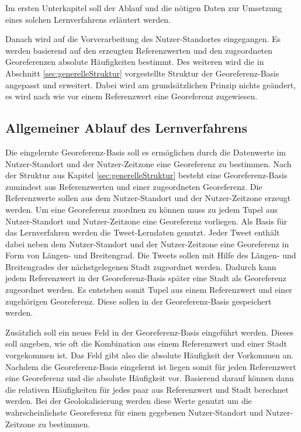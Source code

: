 		Im ersten Unterkapitel soll der Ablauf und die nötigen Daten zur Umsetzung eines solchen Lernverfahrens erläutert werden.

		Danach wird auf die Vorverarbeitung des Nutzer-Standortes eingegangen.
		Es werden basierend auf den erzeugten Referenzwerten und den zugeordneten Georeferenzen absolute Häufigkeiten bestimmt.
		Des weiteren wird die in Abschnitt \ref{sec:generelleStruktur} vorgestellte Struktur der Georeferenz-Basis angepasst und erweitert.
		Dabei wird am grundsätzlichen Prinzip nichts geändert, es wird nach wie vor einem Referenzwert eine Georeferenz zugewiesen. 

		\subsection{Allgemeiner Ablauf des Lernverfahrens}

			Die eingelernte Georeferenz-Basis soll es ermöglichen durch die Datenwerte im Nutzer-Standort und der Nutzer-Zeitzone eine Georeferenz zu bestimmen.
			Nach der Struktur aus Kapitel \ref{sec:generelleStruktur} besteht eine Georeferenz-Basis zumindest aus Referenzwerten und einer zugeordneten Georeferenz.
			Die Referenzwerte sollen aus dem Nutzer-Standort und der Nutzer-Zeitzone erzeugt werden.
			Um eine Georeferenz zuordnen zu können muss zu jedem Tupel aus Nutzer-Standort und Nutzer-Zeitzone eine Georeferenz vorliegen.
			Als Basis für das Lernverfahren werden die Tweet-Lerndaten genutzt.
			Jeder Tweet enthält dabei neben dem Nutzer-Standort und der Nutzer-Zeitzone eine Georeferenz in Form von Längen- und Breitengrad. 
			Die Tweets sollen mit Hilfe des Längen- und Breitengrades der nächstgelegenen Stadt zugeordnet werden. 
			Dadurch kann jedem Referenzwert in der Georeferenz-Basis später eine Stadt als Georeferenz zugeordnet werden.
			Es entstehen somit Tupel aus einem Referenzwert und einer zugehörigen Georeferenz.
			Diese sollen in der Georeferenz-Basis gespeichert werden.

			Zusätzlich soll ein neues Feld in der Georeferenz-Basis eingeführt werden.
			Dieses soll angeben, wie oft die Kombination aus einem Referenzwert und einer Stadt vorgekommen ist. 
			Das Feld gibt also die absolute Häufigkeit der Vorkommen an.
			Nachdem die Georeferenz-Basis eingelernt ist liegen somit für jeden Referenzwert eine Georeferenz und die absolute Häufigkeit vor.
			Basierend darauf können dann die relativen Häufigkeiten für jedes paar aus Referenzwert und Stadt berechnet werden.
			Bei der Geolokalisierung werden diese Werte genutzt um die wahrscheinlichste Georeferenz für einen gegebenen Nutzer-Standort und Nutzer-Zeitzone zu bestimmen.

